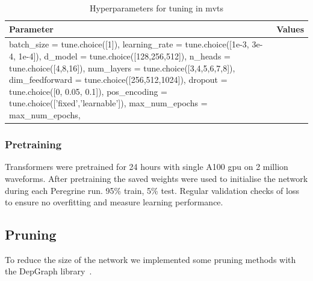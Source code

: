 \begin{table}[h]
    \centering
    \caption{Hyperparameters for tuning in mvts}
    \label{tab:config_parameters}
    \begin{tabular}{@{}ll@{}}
    \toprule
    Parameter       & Values \\ 
    \midrule
    batch_size = tune.choice([1]),
    learning_rate = tune.choice([1e-3, 3e-4, 1e-4]),
    d_model = tune.choice([128,256,512]),
    n_heads = tune.choice([4,8,16]),
    num_layers = tune.choice([3,4,5,6,7,8]),
    dim_feedforward = tune.choice([256,512,1024]),
    dropout = tune.choice([0, 0.05, 0.1]),
    pos_encoding = tune.choice(['fixed','learnable']),
    max_num_epochs = max_num_epochs,
    \end{tabular}
\end{table}

\subsubsection{Pretraining}

Transformers were pretrained for 24 hours with single A100 gpu on 2 million waveforms. After pretraining the saved weights were used to initialise the network during each Peregrine run. 95\% train, 5\% test. Regular validation checks of loss to ensure no overfitting and measure learning performance.


\subsection{Pruning}

To reduce the size of the network we implemented some pruning methods with the DepGraph library~\cite{Fang_Ma_Song_Mi_Wang_2023}.




